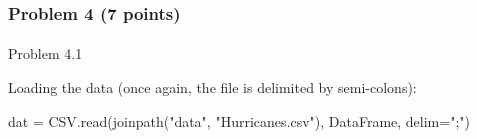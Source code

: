 \documentclass[
  letterpaper,
  DIV=11,
  numbers=noendperiod]{scrartcl}
\makeatletter
\let\oldparagraph\paragraph
\renewcommand{\paragraph}{
    \@ifstar
      \xxxParagraphStar
      \xxxParagraphNoStar
  }
\newcommand{\xxxParagraphStar}[1]{\oldparagraph*{#1}\mbox{}}
\newcommand{\xxxParagraphNoStar}[1]{\oldparagraph{#1}\mbox{}}
\newenvironment{Shaded}{\begin{snugshade}}{\end{snugshade}}
\newcommand{\FunctionTok}[1]{\textcolor[rgb]{0.28,0.35,0.67}{#1}}
\newcommand{\NormalTok}[1]{\textcolor[rgb]{0.00,0.23,0.31}{#1}}
\newcommand{\OperatorTok}[1]{\textcolor[rgb]{0.37,0.37,0.37}{#1}}
\newcommand{\StringTok}[1]{\textcolor[rgb]{0.13,0.47,0.30}{#1}}
\makeatother
\begin{document}
\subsubsection{Problem 4 (7 points)}\label{problem-4-7-points}

\paragraph{Problem 4.1}\label{problem-4.1}

Loading the data (once again, the file is delimited by semi-colons):

\begin{Shaded}
\begin{Highlighting}[]
\NormalTok{dat }\OperatorTok{=}\NormalTok{ CSV.}\FunctionTok{read}\NormalTok{(}\FunctionTok{joinpath}\NormalTok{(}\StringTok{"data"}\NormalTok{, }\StringTok{"Hurricanes.csv"}\NormalTok{), DataFrame, delim}\OperatorTok{=}\StringTok{";"}\NormalTok{)}
\end{Highlighting}
\end{Shaded}
\end{document}
